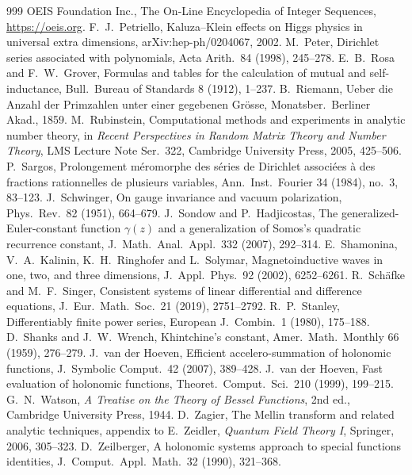 \documentclass[11pt,reqno]{amsart}
\theoremstyle{definition}
\theoremstyle{remark}
\begin{document}
\begin{thebibliography}{999}
 OEIS Foundation Inc., The On-Line Encyclopedia of Integer Sequences, \url{https://oeis.org}.
 F.~J.~Petriello, Kaluza--Klein effects on Higgs physics in universal extra dimensions, arXiv:hep-ph/0204067, 2002.
 M.~Peter, Dirichlet series associated with polynomials, Acta Arith.\ 84 (1998), 245--278.
 E.~B.~Rosa and F.~W.~Grover, Formulas and tables for the calculation of mutual and self-inductance, Bull.\ Bureau of Standards 8 (1912), 1--237.
 B.~Riemann, Ueber die Anzahl der Primzahlen unter einer gegebenen Gr\"osse, Monatsber.\ Berliner Akad., 1859.
 M.~Rubinstein, Computational methods and experiments in analytic number theory, in \emph{Recent Perspectives in Random Matrix Theory and Number Theory}, LMS Lecture Note Ser.\ 322, Cambridge University Press, 2005, 425--506.
 P.~Sargos, Prolongement m\'eromorphe des s\'eries de Dirichlet associ\'ees \`a des fractions rationnelles de plusieurs variables, Ann.\ Inst.\ Fourier 34 (1984), no.~3, 83--123.
 J.~Schwinger, On gauge invariance and vacuum polarization, Phys.\ Rev.\ 82 (1951), 664--679.
 J.~Sondow and P.~Hadjicostas, The generalized-Euler-constant function $\gamma(z)$ and a generalization of Somos's quadratic recurrence constant, J.\ Math.\ Anal.\ Appl.\ 332 (2007), 292--314.
 E.~Shamonina, V.~A.~Kalinin, K.~H.~Ringhofer and L.~Solymar, Magnetoinductive waves in one, two, and three dimensions, J.\ Appl.\ Phys.\ 92 (2002), 6252--6261.
 R.~Sch\"afke and M.~F.~Singer, Consistent systems of linear differential and difference equations,
J.\ Eur.\ Math.\ Soc.\ 21 (2019), 2751--2792.
 R.~P.~Stanley, Differentiably finite power series, European J.\ Combin.\ 1 (1980), 175--188.
 D.~Shanks and J.~W.~Wrench, Khintchine's constant, Amer.\ Math.\ Monthly 66 (1959), 276--279.
 J.~van der Hoeven, Efficient accelero-summation of holonomic functions, J.\ Symbolic Comput.\ 42 (2007), 389--428.
 J.~van der Hoeven, Fast evaluation of holonomic functions, Theoret.\ Comput.\ Sci.\ 210 (1999), 199--215.
 G.~N.~Watson, \emph{A Treatise on the Theory of Bessel Functions}, 2nd ed., Cambridge University Press, 1944.
 D.~Zagier, The Mellin transform and related analytic techniques, appendix to E.~Zeidler, \emph{Quantum Field Theory I}, Springer, 2006, 305--323.
 D.~Zeilberger, A holonomic systems approach to special functions identities, J.\ Comput.\ Appl.\ Math.\ 32 (1990), 321--368.
\end{thebibliography}
\end{document}
